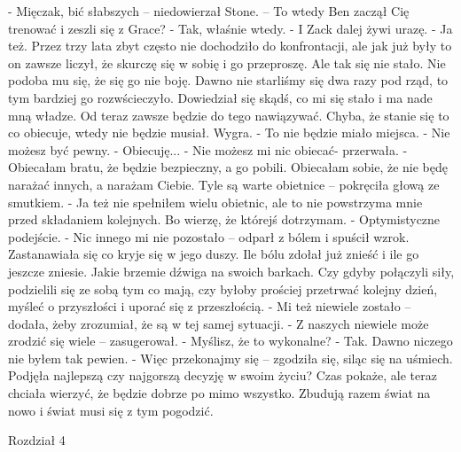 \documentclass[12pt,a4paper]{book}
\begin{document}
- Mięczak, bić słabszych – niedowierzał Stone. – To wtedy Ben zaczął Cię trenować i zeszli się z Grace? 
- Tak, właśnie wtedy. 
- I Zack dalej żywi urazę.
- Ja też. Przez trzy lata zbyt często nie dochodziło do konfrontacji, ale jak już były to on zawsze liczył, że skurczę się w sobię i go przeproszę. Ale tak się nie stało. Nie podoba mu się, że się go nie boję. Dawno nie starliśmy się dwa razy pod rząd, to tym bardziej go rozwścieczyło. Dowiedział się skądś, co mi się stało i ma nade mną władze. Od teraz zawsze będzie do tego nawiązywać. Chyba, że stanie się to co obiecuje, wtedy nie będzie musiał. Wygra. 
- To nie będzie miało miejsca.
- Nie możesz być pewny. 
- Obiecuję...
- Nie możesz mi nic obiecać- przerwała. -Obiecałam bratu, że będzie bezpieczny, a go pobili. Obiecałam sobie, że nie będę narażać innych, a narażam Ciebie. Tyle są warte obietnice – pokręciła głową ze smutkiem. 
- Ja też nie spełniłem wielu obietnic, ale to nie powstrzyma mnie przed składaniem kolejnych. Bo wierzę, że którejś dotrzymam. 
- Optymistyczne podejście. 
- Nic innego mi nie pozostało – odparł z bólem i spuścił wzrok. 
Zastanawiała się co kryje się w jego duszy. Ile bólu zdołał już znieść i ile go jeszcze zniesie. Jakie brzemie dźwiga na swoich barkach. Czy gdyby połączyli siły, podzielili się ze sobą tym co mają, czy byłoby prościej przetrwać kolejny dzień, myśleć o przyszłości i uporać się z przeszłością. 
- Mi też niewiele zostało – dodała, żeby zrozumiał, że są w tej samej sytuacji.
- Z naszych niewiele może zrodzić się wiele – zasugerował. 
- Myślisz, że to wykonalne?
- Tak. Dawno niczego nie byłem tak pewien. 
- Więc przekonajmy się – zgodziła się, siląc się na uśmiech.
Podjęła najlepszą czy najgorszą decyzję w swoim życiu? Czas pokaże, ale teraz chciała wierzyć, że będzie dobrze po mimo wszystko. Zbudują razem świat na nowo i świat musi się z tym pogodzić. 


 
Rozdział 4
\end{document}
